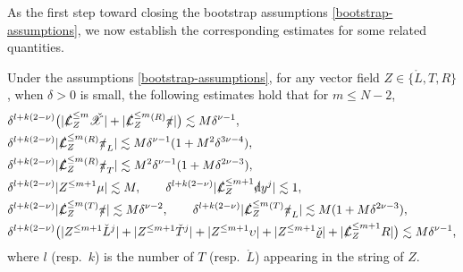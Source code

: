 \documentclass[11pt,twoside]{article}
\def\de{\delta}
\def\ds{\slashed{\operatorname{d}}}
\def\les{\lesssim}
\def\Lc{\check{L}}
\def\Lies{\slashed{\mathcal{L}}}
\def\pis{\slashed{\pi}}
\def\Tc{\check{T}}
\begin{document}
As the first step toward closing the bootstrap assumptions \eqref{bootstrap-assumptions},
we now establish the corresponding estimates for some related quantities.

\begin{proposition}\label{prop:higher-order-L-infty-estimates}
 Under the assumptions \eqref{bootstrap-assumptions}, for any vector field $Z \in \{\mathring{L}, T, R\}$, when $\de > 0$ is small, the following estimates hold that for $m\leq N-2$,
 \begin{equation}\label{eq:higher-order-L-infty-estimates}
 \begin{split}
 &\de^{l+k(2-\nu)} \big( |\Lies_{Z}^{\leq m} \check{\mathscr{X}}|+ |\Lies_{Z}^{\leq m} {}^{(R)}\pis|\big) \les M\de^{\nu-1}, \\
 &\de^{l+k(2-\nu)} |\Lies_{Z}^{\leq m} {}^{(R)}\pis_L|\les M\de^{\nu-1}(1 + M^2\delta^{3\nu-4}), \\
 &\de^{l+k(2-\nu)} |\Lies_{Z}^{\leq m} {}^{(R)}\pis_T|\lesssim M^2\de^{\nu-1}(1 + M\delta^{2\nu-3}), \\
 &\de^{l+k(2-\nu)} |Z^{\leq m+1} \mu| \les M, \qquad\de^{l+k(2-\nu)} |\Lies_{Z}^{\leq m+1} \ds y^j| \les 1, \\
 &\de^{l+k(2-\nu)} |\Lies_Z^{\leq m} {}^{(T)}\pis|\les M\de^{\nu-2}, \qquad\de^{l+k(2-\nu)} |\Lies_Z^{\leq m} {}^{(T)}\pis_L|\lesssim M(1 + M\delta^{2\nu-3}), \\
 &\de^{l+k(2-\nu)} \big(|Z^{\leq m+1} \Lc^j| + |Z^{\leq m+1} \Tc^j|+ |Z^{\leq m+1} \upsilon| +|Z^{\leq m+1} \check\varrho| + |\Lies_{Z}^{\leq m+1} R| \big) \les M\de^{\nu-1},
 \end{split}
 \end{equation}
 where $l$ (resp.\ $k$) is the number of $T$ (resp.\ $\mathring{L}$) appearing in the string of $Z$.
\end{proposition}
\end{document}
